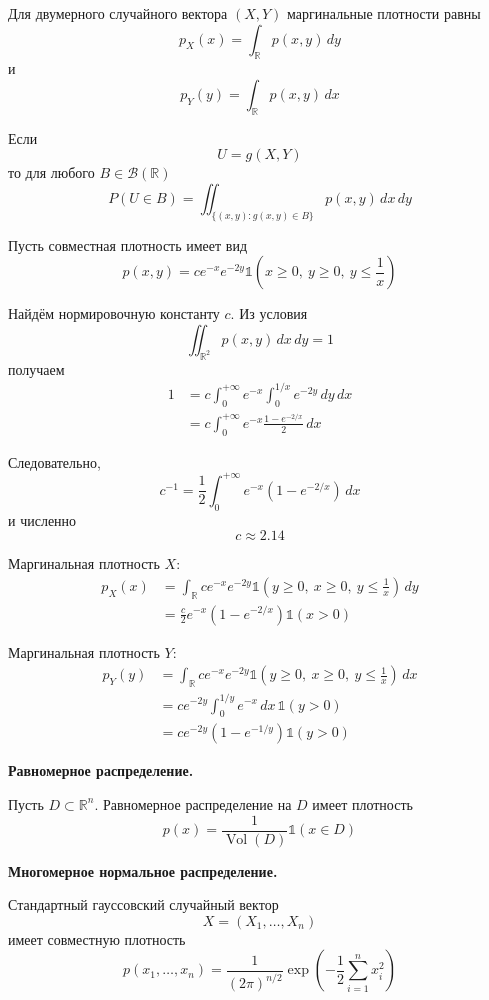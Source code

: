 \documentclass[12pt,a4paper]{article}
\begin{document}
Для двумерного случайного вектора $(X,Y)$ маргинальные плотности равны
\[
p_X(x)=\int_{\mathbb{R}}p(x,y)\,dy
\]
и
\[
p_Y(y)=\int_{\mathbb{R}}p(x,y)\,dx
\]

Если
\[
U=g(X,Y)
\]
то для любого $B\in\mathcal{B}(\mathbb{R})$
\[
P(U\in B)
=
\iint_{\{(x,y):g(x,y)\in B\}}p(x,y)\,dx\,dy
\]

\begin{example}

Пусть совместная плотность имеет вид
\[
p(x,y)
=
c e^{-x}e^{-2y}
\mathds{1}\left(x\geq0,\ y\geq0,\ y\leq\frac1x\right)
\]

Найдём нормировочную константу $c$. Из условия
\[
\iint_{\mathbb{R}^2}p(x,y)\,dx\,dy=1
\]
получаем
\[
\begin{aligned}
1
&=
c\int_0^{+\infty}e^{-x}
\int_0^{1/x}e^{-2y}\,dy\,dx\\
&=
c\int_0^{+\infty}
e^{-x}\frac{1-e^{-2/x}}{2}\,dx
\end{aligned}
\]

Следовательно,
\[
c^{-1}
=
\frac12\int_0^{+\infty}
e^{-x}\left(1-e^{-2/x}\right)\,dx
\]
и численно
\[
c\approx 2.14
\]

Маргинальная плотность $X$:
\[
\begin{aligned}
p_X(x)
&=
\int_{\mathbb{R}}
c e^{-x}e^{-2y}
\mathds{1}\left(y\geq0,\ x\geq0,\ y\leq\frac1x\right)\,dy\\
&=
\frac c2 e^{-x}\left(1-e^{-2/x}\right)\mathds{1}(x>0)
\end{aligned}
\]

Маргинальная плотность $Y$:
\[
\begin{aligned}
p_Y(y)
&=
\int_{\mathbb{R}}
c e^{-x}e^{-2y}
\mathds{1}\left(y\geq0,\ x\geq0,\ y\leq\frac1x\right)\,dx\\
&=
c e^{-2y}\int_0^{1/y}e^{-x}\,dx\,
\mathds{1}(y>0)\\
&=
c e^{-2y}\left(1-e^{-1/y}\right)\mathds{1}(y>0)
\end{aligned}
\]

\medskip

\textbf{Равномерное распределение.}

Пусть $D\subset\mathbb{R}^n$. Равномерное распределение на $D$ имеет плотность
\[
p(x)
=
\frac{1}{\operatorname{Vol}(D)}
\mathds{1}(x\in D)
\]

\medskip

\textbf{Многомерное нормальное распределение.}

Стандартный гауссовский случайный вектор
\[
X=(X_1,\ldots,X_n)
\]
имеет совместную плотность
\[
p(x_1,\ldots,x_n)
=
\frac{1}{(2\pi)^{n/2}}
\exp\left(
-\frac12\sum_{i=1}^n x_i^2
\right)
\]


\end{example}
\end{document}
